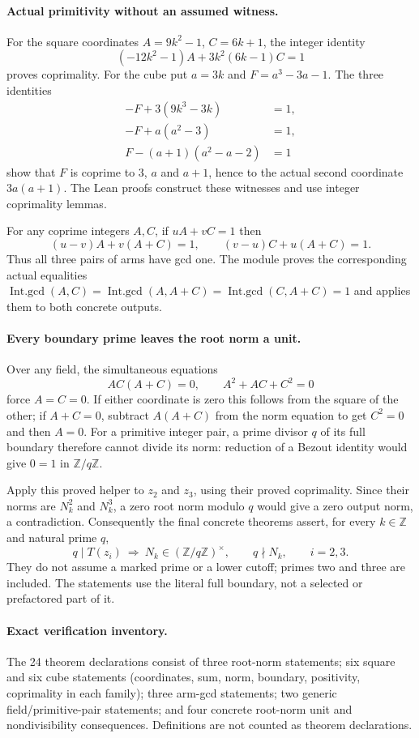 \paragraph{Actual primitivity without an assumed witness.}
For the square coordinates $A=9k^2-1$, $C=6k+1$, the integer
identity
\[
 (-12k^2-1)A+3k^2(6k-1)C=1
\]
proves coprimality. For the cube put $a=3k$ and $F=a^3-3a-1$.
The three identities
\[
 \begin{split}
 -F+3(9k^3-3k)&=1,\\
 -F+a(a^2-3)&=1,\\
 F-(a+1)(a^2-a-2)&=1
 \end{split}
\]
show that $F$ is coprime to $3$, $a$ and $a+1$, hence to the
actual second coordinate $3a(a+1)$. The Lean proofs construct these
witnesses and use integer coprimality lemmas.

For any coprime integers $A,C$, if $uA+vC=1$ then
\[
 (u-v)A+v(A+C)=1,\qquad
 (v-u)C+u(A+C)=1.
\]
Thus all three pairs of arms have gcd one. The module proves the
corresponding actual equalities
$\operatorname{Int.gcd}(A,C)=
\operatorname{Int.gcd}(A,A+C)=
\operatorname{Int.gcd}(C,A+C)=1$
and applies them to both concrete outputs.

\paragraph{Every boundary prime leaves the root norm a unit.}
Over any field, the simultaneous equations
\[
 AC(A+C)=0,\qquad A^2+AC+C^2=0
\]
force $A=C=0$. If either coordinate is zero this follows from the
square of the other; if $A+C=0$, subtract $A(A+C)$ from the norm
equation to get $C^2=0$ and then $A=0$.
For a primitive integer pair, a prime divisor $q$ of its full
boundary therefore cannot divide its norm: reduction of a Bezout
identity would give $0=1$ in $\mathbb Z/q\mathbb Z$.

Apply this proved helper to $z_2$ and $z_3$, using their proved
coprimality. Since their norms are $N_k^2$ and $N_k^3$, a zero
root norm modulo $q$ would give a zero output norm, a contradiction.
Consequently the final concrete theorems assert, for every
$k\in\mathbb Z$ and natural prime $q$,
\[
 q\mid T(z_i)\ \Longrightarrow\
 N_k\in(\mathbb Z/q\mathbb Z)^\times,
 \qquad q\nmid N_k,\qquad i=2,3.
\]
They do not assume a marked prime or a lower cutoff; primes two and
three are included. The statements use the literal full boundary,
not a selected or prefactored part of it.

\paragraph{Exact verification inventory.}
The 24 theorem declarations consist of three root-norm statements;
six square and six cube statements (coordinates, sum, norm, boundary,
positivity, coprimality in each family); three arm-gcd statements;
two generic field/primitive-pair statements; and four concrete
root-norm unit and nondivisibility consequences. Definitions are
not counted as theorem declarations.

